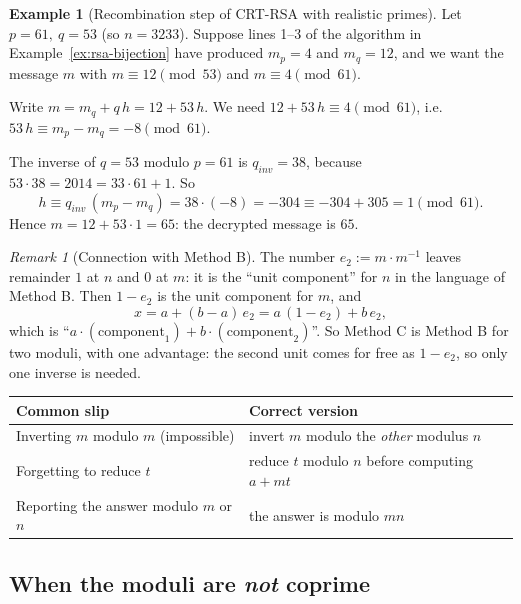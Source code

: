 \documentclass[11pt]{article}
\theoremstyle{definition}
\newtheorem{example}[theorem]{Example}
\theoremstyle{remark}
\newtheorem{remark}[theorem]{Remark}
\begin{document}
\begin{example}[Recombination step of CRT-RSA with realistic primes]
Let $p=61,\ q=53$ (so $n=3233$). Suppose lines 1--3 of the algorithm in Example~\ref{ex:rsa-bijection} have produced $m_p=4$ and $m_q=12$, and we want the message $m$ with $m\equiv12\pmod{53}$ and $m\equiv4\pmod{61}$.

Write $m=m_q+q\,h=12+53\,h$. We need $12+53\,h\equiv4\pmod{61}$, i.e.\ $53\,h\equiv m_p-m_q=-8\pmod{61}$.

The inverse of $q=53$ modulo $p=61$ is $q_{inv}=38$, because $53\cdot38=2014=33\cdot61+1$. So
\[
h\equiv q_{inv}\,(m_p-m_q)=38\cdot(-8)=-304\equiv-304+305=1\pmod{61}.
\]
Hence $m=12+53\cdot1=65$: the decrypted message is $65$.
\end{example}

\begin{remark}[Connection with Method B]
The number $e_2:=m\cdot m^{-1}$ leaves remainder $1$ at $n$ and $0$ at $m$: it is the ``unit component'' for $n$ in the language of Method B. Then $1-e_2$ is the unit component for $m$, and
\[
x=a+(b-a)\,e_2=a\,(1-e_2)+b\,e_2,
\]
which is ``$a\cdot(\text{component}_1)+b\cdot(\text{component}_2)$''. So Method C is Method B for two moduli, with one advantage: the second unit comes for free as $1-e_2$, so only one inverse is needed.
\end{remark}

\begin{center}
\renewcommand{\arraystretch}{1.3}
\begin{tabular}{ll}
\toprule
\textbf{Common slip} & \textbf{Correct version} \\
\midrule
Inverting $m$ modulo $m$ (impossible) & invert $m$ modulo the \emph{other} modulus $n$ \\
Forgetting to reduce $t$ & reduce $t$ modulo $n$ before computing $a+mt$ \\
Reporting the answer modulo $m$ or $n$ & the answer is modulo $mn$ \\
\bottomrule
\end{tabular}
\end{center}

\subsection{When the moduli are \emph{not} coprime}\label{sec:qs-noncoprime}
\end{document}
